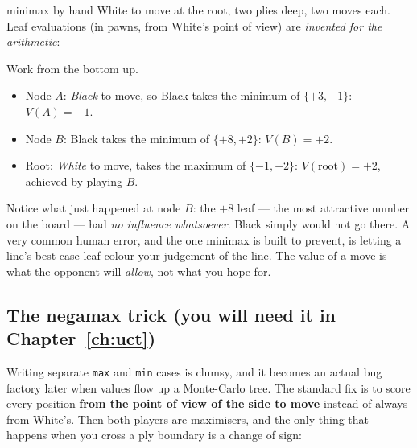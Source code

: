 \begin{worked}{minimax by hand}
White to move at the root, two plies deep, two moves each. Leaf evaluations (in pawns, from
White's point of view) are \emph{invented for the arithmetic}:

\begin{center}
\end{center}

Work from the bottom up.
\begin{itemize}
\item Node $A$: \emph{Black} to move, so Black takes the minimum of $\{+3,-1\}$: $V(A) = -1$.
\item Node $B$: Black takes the minimum of $\{+8,+2\}$: $V(B) = +2$.
\item Root: \emph{White} to move, takes the maximum of $\{-1,+2\}$: $V(\text{root}) = +2$,
  achieved by playing $B$.
\end{itemize}

Notice what just happened at node $B$: the $+8$ leaf --- the most attractive number on the
board --- had \emph{no influence whatsoever}. Black simply would not go there. A very
common human error, and the one minimax is built to prevent, is letting a line's best-case
leaf colour your judgement of the line. The value of a move is what the opponent will
\emph{allow}, not what you hope for.
\end{worked}

\subsection{The negamax trick (you will need it in Chapter~\ref{ch:uct})}

Writing separate \texttt{max} and \texttt{min} cases is clumsy, and it becomes an actual bug
factory later when values flow up a Monte-Carlo tree. The standard fix is to score every
position \textbf{from the point of view of the side to move} instead of always from White's.
Then both players are maximisers, and the only thing that happens when you cross a ply
boundary is a change of sign:

